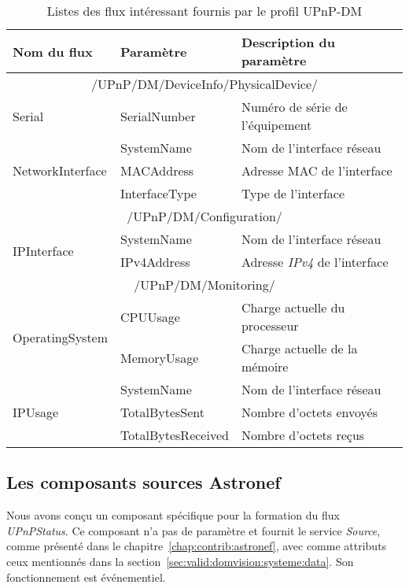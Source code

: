 \begin{table}[ht]
\centering
\begin{tabular}{|m{}|>{\ttfamily}m{}|m{}|} \bottomrule
\rowcolor{hypcolor} Nom du flux & \rm Paramètre & Description du paramètre\\ \hline
\multicolumn{3}{|c|}{/UPnP/DM/DeviceInfo/PhysicalDevice/} \\\hline
Serial & {SerialNumber} & Numéro de série de l'équipement\\\hline
\multirow{3}{*}{NetworkInterface} & {SystemName} & Nom de l'interface réseau\\\cline{2-3}
& {MACAddress} & Adresse MAC de l'interface\\\cline{2-3}
& InterfaceType & Type de l'interface \\\hline
\multicolumn{3}{|c|}{/UPnP/DM/Configuration/} \\\hline
\multirow{2}{*}{IPInterface} & SystemName & Nom de l'interface réseau \\\cline{2-3}
& IPv4Address & Adresse \textit{IPv4} de l'interface \\ \hline
\multicolumn{3}{|c|}{/UPnP/DM/Monitoring/} \\\hline
\multirow{2}{*}{OperatingSystem} & CPUUsage & Charge actuelle du processeur\\\cline{2-3}
& MemoryUsage & Charge actuelle de la mémoire\\ \hline
\multirow{3}{*}{IPUsage} & SystemName & Nom de l'interface réseau\\ \cline{2-3}
& TotalBytesSent & Nombre d'octets envoyés \\\cline{2-3}
& TotalBytesReceived & Nombre d'octets reçus \\ \toprule
\end{tabular}
\caption{Listes des flux intéressant fournis par le profil UPnP-DM}\label{tab:valid:domvision:upnpdm}
\end{table}

\subsection{Les composants sources Astronef}
Nous avons conçu un composant spécifique pour la formation du flux \textit{UPnPStatus}. Ce composant n'a pas de paramètre et fournit le service \textit{Source}, comme présenté dans le chapitre~\ref{chap:contrib:astronef}, avec comme attributs ceux mentionnés dans la section~\ref{sec:valid:domvision:systeme:data}. Son fonctionnement est événementiel.

